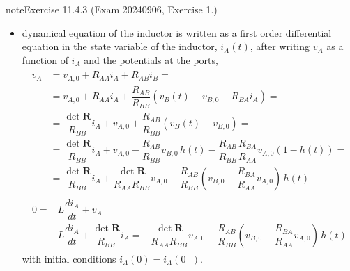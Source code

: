 \documentclass[letterpaper,10pt,english]{jupyterBook}
\begin{document}
\begin{sphinxadmonition}{note}{Exercise 11.4.3 (Exam 2024\sphinxhyphen{}09\sphinxhyphen{}06, Exercise 1.)}
\begin{itemize}
\begin{equation*}
\begin{split}
\begin{aligned}
   \end{aligned}\end{split}
\end{equation*}
\item {} 
\sphinxAtStartPar
dynamical equation of the inductor is written as a first order differential equation in the state variable of the inductor, \(i_A(t)\), after writing \(v_A\) as a function of \(i_A\) and the potentials at the ports,
\begin{equation*}
\begin{split}\begin{aligned}
     v_A 
     & = v_{A,0} + R_{AA} i_A + R_{AB} i_B = \\
     & = v_{A,0} + R_{AA} i_A + \dfrac{R_{AB}}{R_{BB}} \left( v_B(t) - v_{B,0} - R_{BA} i_A \right) = \\
     & = \dfrac{\det \mathbf{R}}{R_{BB}} i_A + v_{A,0} + \dfrac{R_{AB}}{R_{BB}} \left( v_B(t) - v_{B,0} \right) = \\
     & = \dfrac{\det \mathbf{R}}{R_{BB}} i_A + v_{A,0} - \dfrac{R_{AB}}{R_{BB}} v_{B,0} \, h(t) -  \dfrac{R_{AB}}{R_{BB}}\dfrac{R_{BA}}{R_{AA}} v_{A,0} (1- h(t)) = \\
     & = \dfrac{\det \mathbf{R}}{R_{BB}} i_A + \dfrac{\det \mathbf{R}}{R_{AA} R_{BB}} v_{A,0} - \dfrac{R_{AB}}{R_{BB}}\left( v_{B,0} - \dfrac{R_{BA}}{R_{AA}} v_{A,0} \right) \, h(t)
  \end{aligned}\end{split}
\end{equation*}\begin{equation*}
\begin{split}\begin{aligned}
    0 = & L \dfrac{d i_A}{dt} + v_A \\
        & L \dfrac{d i_A}{dt} + \dfrac{\det \mathbf{R}}{R_{BB}} i_A = - \dfrac{\det \mathbf{R}}{R_{AA} R_{BB}} v_{A,0} + \dfrac{R_{AB}}{R_{BB}} \left( v_{B,0} - \dfrac{R_{BA}}{R_{AA}} v_{A,0}  \right) \, h(t)
  \end{aligned}\end{split}
\end{equation*}
\sphinxAtStartPar
with initial conditions \(i_A(0) = i_A(0^-)\).


\end{itemize}
\end{sphinxadmonition}
\end{document}

